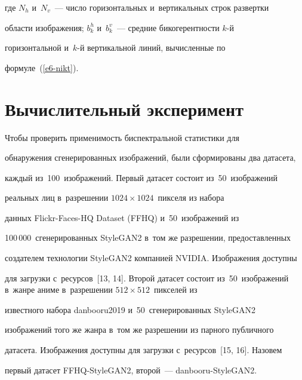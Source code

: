 где $N_h$ и~$N_v$~--- число горизонтальных и~вертикальных строк развертки 


области изображения; $b_k^h$ и~$b_k^v$~--- средние би\-ко\-ге\-рент\-ности $k$-й 


горизонтальной и~$k$-й вертикальной линий, вычисленные по  


формуле~(\ref{e6-nikt}).








\vspace*{-2pt}





\section{Вычислительный эксперимент}





\vspace*{-2pt}





  Чтобы проверить применимость биспектральной статистики для 


обнаружения сгенерированных изображений, были сформированы два датасета, 


каждый из~100~изображений. Первый датасет состоит из~50~изображений 


реальных лиц в~разрешении $1024\times 1024$~пикселя из набора 


данных Flickr-Faces-HQ Dataset (FFHQ) и~50~изоб\-ра\-же\-ний из 


100\,000~сгенерированных \mbox{StyleGAN2} в~том же разрешении, предоставленных 


создателем технологии \mbox{StyleGAN2} компанией NVIDIA. Изобра\-же\-ния доступны 


для загрузки с~ресурсов~[13, 14]. Второй датасет состоит из~50~изоб\-ра\-же\-ний в~жан\-ре аниме в~разрешении $512\times 512$~пикселей из 


известного набора \mbox{danbooru2019} и~50~сгенерированных \mbox{StyleGAN2} 


изображений того же жан\-ра в~том же разрешении из парного пуб\-лич\-но\-го 


датасета. Изоб\-ра\-же\-ния доступны для за\-груз\-ки с~ресурсов~[15, 16]. Назовем 


первый датасет FFHQ-StyleGAN2, второй~--- danbooru-StyleGAN2. 


